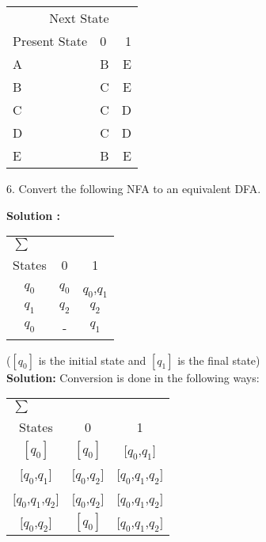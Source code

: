 \documentclass [10pt,a4paper,tikz] {book}
\begin{document}
\begin{center}

\begin{tabular}{llr}
\toprule
\multicolumn{2}{r}{Next State} \\
\cmidrule(r){2-3}
 Present State & 0 {\hspace{10\tabcolsep}} & 1 \\
    \midrule
    A & B & E \\
    B & C & E \\
    C & C & D \\
    D & C & D \\
    E & B & E \\

    \bottomrule


\end{tabular}

\end{center}

6. Convert the following NFA to an equivalent DFA.


\textbf{Solution :}

\begin{center}

\begin{tabular}{ccc}
\toprule
\multicolumn{3}{l}{$\sum$} \\
\cmidrule(r){1-1}
 States & 0 & 1 \\
    \midrule
    ${q}_{0}$ & ${q}_{0}$ & ${q}_{0}$,${q}_{1}$ \\
    ${q}_{1}$ & ${q}_{2}$ & ${q}_{2}$ \\
    ${q}_{0}$ & - & ${q}_{1}$ \\

    \bottomrule


\end{tabular}

\end{center}

($[{q}_{0}]$ is the initial state and $[{q}_{1}]$ is the final state)\\
\textbf{Solution:} Conversion is done in the following ways:
\\

\begin{center}

\begin{tabular}{ccc}
\toprule
\multicolumn{3}{l}{$\sum$} \\
\cmidrule(r){1-1}
 States & 0 & 1 \\
    \midrule
    $[{q}_{0}]$ & $[{q}_{0}]$ & $[{q}_{0}$,${q}_{1}]$ \\
    $[{q}_{0}$,${q}_{1}]$ & $[{q}_{0}$,${q}_{2}]$ & $[{q}_{0}$,${q}_{1}$,${q}_{2}]$ \\
    $[{q}_{0}$,${q}_{1}$,${q}_{2}]$ & $[{q}_{0}$,${q}_{2}]$ & $[{q}_{0}$,${q}_{1}$,${q}_{2}]$ \\
    $[{q}_{0}$,${q}_{2}]$ & $[{q}_{0}]$ & $[{q}_{0}$,${q}_{1}$,${q}_{2}]$ \\

    \bottomrule


\end{tabular}

\end{center}
\end{document}
